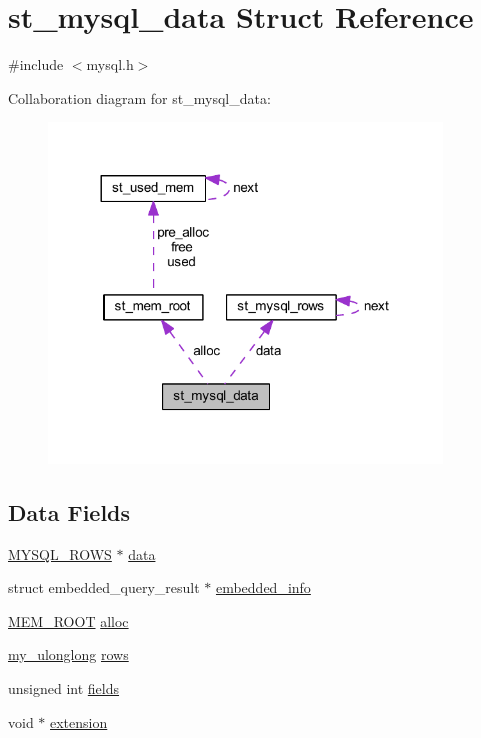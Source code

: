 \hypertarget{structst__mysql__data}{}\section{st\+\_\+mysql\+\_\+data Struct Reference}
\label{structst__mysql__data}


{\ttfamily \#include $<$mysql.\+h$>$}



Collaboration diagram for st\+\_\+mysql\+\_\+data\+:\nopagebreak
\begin{figure}[H]
\begin{center}
\leavevmode
\includegraphics[width=296pt]{structst__mysql__data__coll__graph}
\end{center}
\end{figure}
\subsection*{Data Fields}
\begin{DoxyCompactItemize}
\item 
\hyperlink{mysql_8h_a4d0140764825a51eae874c641df1afb5}{M\+Y\+S\+Q\+L\+\_\+\+R\+O\+W\+S} $\ast$ \hyperlink{structst__mysql__data_a337e8b819b025e698105616e55d76c4a}{data}
\item 
struct embedded\+\_\+query\+\_\+result $\ast$ \hyperlink{structst__mysql__data_ac3e93e741da8215714fbb6e6b6db603b}{embedded\+\_\+info}
\item 
\hyperlink{my__alloc_8h_ac59e289b254a2c5ac634ffcedda3f823}{M\+E\+M\+\_\+\+R\+O\+O\+T} \hyperlink{structst__mysql__data_a177d9effffa87659af590d973ab8d955}{alloc}
\item 
\hyperlink{mysql_8h_ae05bd5d3e5a75578e2f14cfeb43f07aa}{my\+\_\+ulonglong} \hyperlink{structst__mysql__data_ad22f63e6158c6b6e408fdcb255fdbe3d}{rows}
\item 
unsigned int \hyperlink{structst__mysql__data_a2f8ebd2f46566f6476d3588b7e6ea25c}{fields}
\item 
void $\ast$ \hyperlink{structst__mysql__data_afe54e3ced201bd33385957d58520d5a3}{extension}
\end{DoxyCompactItemize}



